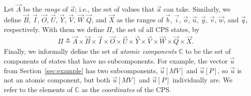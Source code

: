 \begin{definition}
Let $\vec{A}$ be the \emph{range} of $\vec{a}$; i.e., the set of values that $\vec{a}$ can take. Similarly, we define $\vec{B}$, $\vec{I}$, $\vec{O}$, $\vec{U}$, $\vec{Y}$,  $\vec{V}$, $\vec{W}$ $\vec{Q}$, and $\vec{X}$ as the ranges of $\vec{b}$, $\vec{i}$, $\vec{o}$, $\vec{u}$, $\vec{y}$, $\vec{v}$, $\vec{w}$, and $\vec{q}$, respectively. With them we define $\Pi$, the set of all CPS states, by 
\begin{align}
  \Pi\triangleq \vec{A}\times\vec{B}\times\vec{I}\times\vec{O}\times\vec{U}\times\vec{Y}\times\vec{V}\times\vec{W}\times\vec{Q}\times\vec{X}.  
\end{align}
Finally, we informally define the set of \emph{atomic components} $\mathbb{C}$ to be the set of components of states that have no subcomponents. For example, the vector $\vec{u}$ from Section~\ref{sec:example} has two subcomponents, $\vec{u}[MV]$ and $\vec{u}[P]$, so $\vec{u}$ is not an atomic component, but both $\vec{u}[MV]$ and $\vec{u}[P]$ individually are. We refer to the elements of $\mathbb{C}$ as the \emph{coordinates} of the CPS.
\end{definition}

